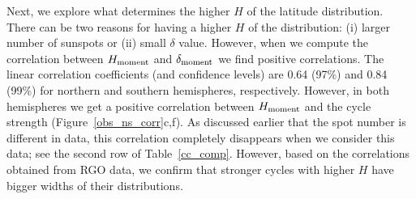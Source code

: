 \documentclass[preprint2,times,tighten]{aastex61}
\newcommand{\Fig}[1]{Figure~\ref{#1}}
\begin{document}
Next, we explore what determines the higher $H$ of the latitude distribution.
There can be two reasons for having a higher $H$ of the distribution:
(i) larger number of sunspots or (ii) small $\delta$ value. 
However, when we compute the correlation between $H_{\rm{moment}}$ and $\delta_{\rm{moment}}$
we find positive correlations. The linear correlation coefficients (and confidence levels) 
are 0.64 (97\%) and 0.84 (99\%) for northern and southern hemispheres, respectively. 
However, in both hemispheres we get a positive correlation between $H_{\rm{ moment}}$ and 
the cycle strength (\Fig{obs_ns_corr}c,f). 
As discussed earlier that the spot number is different in \citet{2017A&A...599A.131L} data, this correlation completely disappears
when we consider this data; see the second row of Table~\ref{cc_comp}. 
However, based on the correlations obtained from RGO data, we confirm that stronger cycles with higher $H$ have
bigger widths of their distributions.
\end{document}
